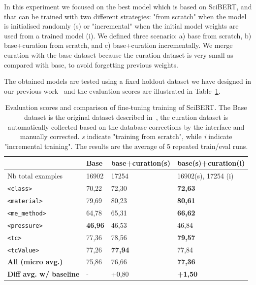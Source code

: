 \documentclass[a4paper]{article}
\begin{document}
In this experiment we focused on the best model which is based on SciBERT, and that can be trained with two different strategies: "from scratch" when the model is initialised randomly (s) or "incremental" when the initial model weights are used from a trained model (i).
We defined three scenario: a) base from scratch, b) base+curation from scratch, and c) base+curation incrementally. 
We merge curation with the base dataset because the curation dataset is very small as compared with base, to avoid forgetting previous weights.  

The obtained models are tested using a fixed holdout dataset we have designed in our previous work~\cite{lfoppiano2023automatic} and the evaluation scores are illustrated in Table~\ref{tab:evaluation-curation-training}.

\begin{table}[ht]
\centering
\begin{tabular}{|l|l|l|l|}
\hline
& \textbf{Base} & \textbf{base+curation(s)} & \textbf{base(s)+curation(i)} \\ 
\hline
\hline
Nb total examples & 16902 & 17254 & 16902(s), 17254 (i)\\ 
\hline
\texttt{<class>}        & 70,22             & 72,30             & \textbf{72,63} \\ 
\texttt{<material>}     & 79,69             & 80,23             & \textbf{80,61} \\ 
\texttt{<me\_method>}   & 64,78             & 65,31             & \textbf{66,62} \\ 
\texttt{<pressure>}     & \textbf{46,96}    & 46,53             & 46,84 \\ 
\texttt{<tc>}           & 77,36             & 78,56             & \textbf{79,57} \\ 
\texttt{<tcValue>}      & 77,26             & \textbf{77,94}    & 77,84 \\ 
\hline
\textbf{All (micro avg.)} & 75,86           & 76,66             & \textbf{77,36} \\ 
\hline
\textbf{Diff avg. w/ baseline}& -           & +0,80             & \textbf{+1,50} \\ 
\hline
\end{tabular}
\caption{Evaluation scores and comparison of fine-tuning training of SciBERT. The Base dataset is the original dataset described in~\cite{lfoppiano2023automatic}, the curation dataset is automatically collected based on the database corrections by the interface and manually corrected. \textit{s} indicate "training from scratch", while \textit{i} indicate "incremental training". The results are the average of 5 repeated train/eval runs. }
\label{tab:evaluation-curation-training}
\end{table}
\end{document}
